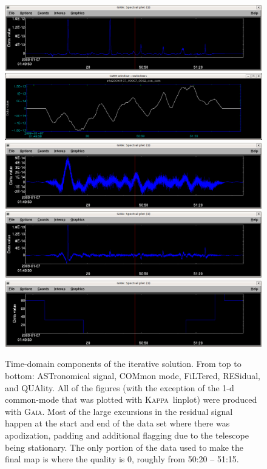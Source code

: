 \documentclass[twoside,11pt]{article}
\newcommand{\Kappa}{\xref{\textsc{Kappa}}{sun95}{}}
\newcommand{\gaia}{\xref{\textsc{Gaia}}{sun214}{}}
\newcommand{\task}[1]{\textsf{#1}}
\newcommand{\linplot}{\xref{\task{linplot}}{sun95}{LINPLOT}}
\newcommand{\xref}[3]{#1}
\renewcommand{\_}{\texttt{\symbol{95}}}
\begin{document}
\begin{figure}
\begin{center}
\includegraphics[width=0.9\linewidth]{iter_ast.eps} \\
\includegraphics[width=0.9\linewidth]{iter_com.eps} \\
\includegraphics[width=0.9\linewidth]{iter_flt.eps} \\
\includegraphics[width=0.9\linewidth]{iter_res.eps} \\
\includegraphics[width=0.9\linewidth]{iter_qua.eps} \\
\caption{Time-domain components of the iterative solution. From top to
  bottom: ASTronomical signal, COMmon mode, FiLTered, RESidual, and
  QUAlity. All of the figures (with the exception of the 1-d
  common-mode that was plotted with \Kappa\ \linplot) were produced
  with \gaia. Most of the large excursions in the residual signal
  happen at the start and end of the data set where there was
  apodization, padding and additional flagging due to the telescope
  being stationary. The only portion of the data used to make the
  final map is where the quality is 0, roughly from 50:20 -- 51:15.}
\label{fig:itercomp}
\end{center}
\end{figure}
\end{document}
